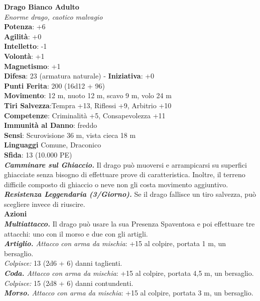 \begin{multicols}{2}
\medskip\textbf{Drago Bianco Adulto}\\
\emph{Enorme drago, caotico malvagio}\\
\textbf{Potenza}: +6\\
\textbf{Agilità}: +0\\
\textbf{Intelletto}: -1\\
\textbf{Volontà}: +1\\
\textbf{Magnetismo}: +1\\
\textbf{Difesa}: 23 (armatura naturale) - \textbf{Iniziativa}: +0\\
\textbf{Punti Ferita}: 200 (16d12 + 96)\\
\textbf{Movimento}: 12 m, nuoto 12 m, scavo 9 m, volo 24 m\\
\textbf{Tiri Salvezza}:Tempra +13, Riflessi +9, Arbitrio +10\\
\textbf{Competenze}: Criminalità +5, Consapevolezza +11\\
\textbf{Immunità al Danno}: freddo\\
\textbf{Sensi}: Scurovisione 36 m, vista cieca 18 m\\
\textbf{Linguaggi} Comune, Draconico\\
\textbf{Sfida}: 13 (10.000 PE)\smallskip\\
\emph{\textbf{Camminare sul Ghiaccio.}} Il drago può muoversi e arrampicarsi su superfici ghiacciate senza bisogno di effettuare prove di caratteristica. Inoltre, il terreno difficile composto di ghiaccio o neve non gli costa movimento aggiuntivo.\\
\emph{\textbf{Resistenza Leggendaria (3/Giorno).}} Se il drago fallisce un tiro salvezza, può scegliere invece di riuscire.\\
\smallskip\textbf{Azioni}\\
\emph{\textbf{Multiattacco.}} Il drago può usare la sua Presenza Spaventosa e poi effettuare tre attacchi: uno con il morso e due con gli artigli.\\
\emph{\textbf{Artiglio.} Attacco con arma da mischia}: +15 al colpire, portata 1 m, un bersaglio.\\
\emph{Colpisce:} 13 (2d6 + 6) danni taglienti.\\
\emph{\textbf{Coda.} Attacco con arma da mischia}: +15 al colpire, portata 4,5 m, un bersaglio.\\
\emph{Colpisce:} 15 (2d8 + 6) danni contundenti.\\
\emph{\textbf{Morso.} Attacco con arma da mischia}: +15 al colpire, portata 3 m, un bersaglio.\\

\end{multicols}
